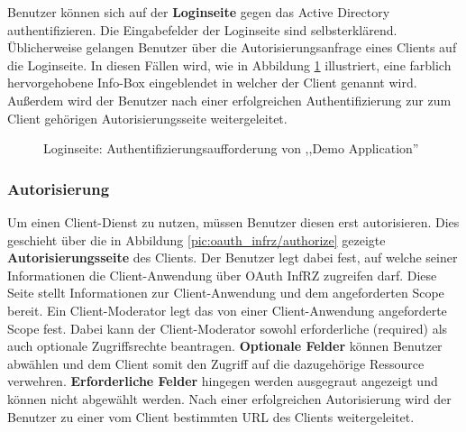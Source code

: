 \documentclass[12pt,a4paper,pointednumbers,abstracton]{scrartcl}
\begin{document}
Benutzer können sich auf der \textbf{Loginseite} gegen das Active Directory authentifizieren.
Die Eingabefelder der Loginseite sind selbsterklärend.
Üblicherweise gelangen Benutzer über die Autorisierungsanfrage eines Clients auf die Loginseite.
In diesen Fällen wird, wie in Abbildung \ref{pic:oauth_infrz/login_client} illustriert, eine farblich hervorgehobene Info-Box eingeblendet in welcher der Client genannt wird.
Außerdem wird der Benutzer nach einer erfolgreichen Authentifizierung zur zum Client gehörigen Autorisierungsseite weitergeleitet.

\begin{figure}[h!]
\centering
{}
\caption{Loginseite: Authentifizierungsaufforderung von ,,Demo Application''}
\label{pic:oauth_infrz/login_client}
\end{figure}

\subsubsection{Autorisierung}

Um einen Client-Dienst zu nutzen, müssen Benutzer diesen erst autorisieren.
Dies geschieht über die in Abbildung \ref{pic:oauth_infrz/authorize} gezeigte \textbf{Autorisierungsseite} des Clients.
Der Benutzer legt dabei fest, auf welche seiner Informationen die Client-Anwendung über OAuth InfRZ zugreifen darf.
Diese Seite stellt Informationen zur Client-Anwendung und dem angeforderten Scope bereit.
Ein Client-Moderator legt das von einer Client-Anwendung angeforderte Scope fest.
Dabei kann der Client-Moderator sowohl erforderliche (required) als auch optionale Zugriffsrechte beantragen.
\textbf{Optionale Felder} können Benutzer abwählen und dem Client somit den Zugriff auf die dazugehörige Ressource verwehren.
\textbf{Erforderliche Felder} hingegen werden ausgegraut angezeigt und können nicht abgewählt werden.
Nach einer erfolgreichen Autorisierung wird der Benutzer zu einer vom Client bestimmten URL des Clients weitergeleitet.
\end{document}
